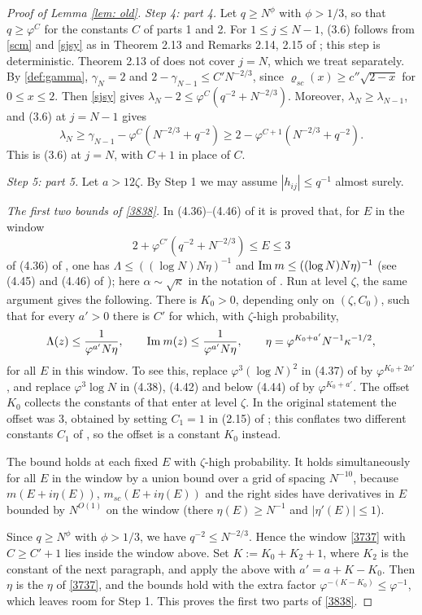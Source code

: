 \begin{proof}[Proof of Lemma \ref{lem: old}]
{\it Step 4: part 4.} Let $q\ge N^\phi$ with $\phi>1/3$, so that $q\ge\varphi^C$ for the constants $C$ of parts 1 and 2. For $1\le j\le N-1$, (3.6) follows from \eqref{scm} and \eqref{sjsy} as in Theorem 2.13 and Remarks 2.14, 2.15 of \cite{EKYY1}; this step is deterministic. Theorem 2.13 of \cite{EKYY1} does not cover $j=N$, which we treat separately. By \eqref{def:gamma}, $\gamma_N=2$ and $2-\gamma_{N-1}\le C'N^{-2/3}$, since $\varrho_{sc}(x)\ge c''\sqrt{2-x}$ for $0\le x\le2$. Then \eqref{sjsy} gives $\lambda_N-2\le\varphi^C(q^{-2}+N^{-2/3})$. Moreover, $\lambda_N\ge\lambda_{N-1}$, and (3.6) at $j=N-1$ gives
$$
\lambda_N\ge\gamma_{N-1}-\varphi^C(N^{-2/3}+q^{-2})\ge2-\varphi^{C+1}(N^{-2/3}+q^{-2}).
$$
This is (3.6) at $j=N$, with $C+1$ in place of $C$.

{\it Step 5: part 5.} Let $a>12\zeta$. By Step 1 we may assume $|h_{ij}|\le q^{-1}$ almost surely.

{\it The first two bounds of \eqref{3838}.} In (4.36)--(4.46) of \cite{EKYY1} it is proved that, for $E$ in the window
$$
2+\varphi^{C'}(q^{-2}+N^{-2/3})\le E\le3
$$
of (4.36) of \cite{EKYY1}, one has $\Lambda\le((\log N)N\eta)^{-1}$ and $\mathrm{Im}\: m\le((\log N)N\eta)^{-1}$ (see (4.45) and (4.46) of \cite{EKYY1}); here $\alpha\sim\sqrt\kappa$ in the notation of \cite{EKYY1}. Run at level $\zeta$, the same argument gives the following. There is $K_0>0$, depending only on $(\zeta,C_0)$, such that for every $a'>0$ there is $C'$ for which, with $\zeta$-high probability,
$$
\Lambda(z)\le\frac{1}{\varphi^{a'}N\eta},\qquad \mathrm{Im}\: m(z)\le\frac{1}{\varphi^{a'}N\eta},\qquad \eta=\varphi^{K_0+a'}N^{-1}\kappa^{-1/2},
$$
for all $E$ in this window. To see this, replace $\varphi^3(\log N)^2$ in (4.37) of \cite{EKYY1} by $\varphi^{K_0+2a'}$, and replace $\varphi^3\log N$ in (4.38), (4.42) and below (4.44) of \cite{EKYY1} by $\varphi^{K_0+a'}$. The offset $K_0$ collects the constants of \cite{EKYY1} that enter at level $\zeta$. In the original statement the offset was $3$, obtained by setting $C_1=1$ in (2.15) of \cite{EKYY1}; this conflates two different constants $C_1$ of \cite{EKYY1}, so the offset is a constant $K_0$ instead.

The bound holds at each fixed $E$ with $\zeta$-high probability. It holds simultaneously for all $E$ in the window by a union bound over a grid of spacing $N^{-10}$, because $m(E+i\eta(E))$, $m_{sc}(E+i\eta(E))$ and the right sides have derivatives in $E$ bounded by $N^{O(1)}$ on the window (there $\eta(E)\ge N^{-1}$ and $|\eta'(E)|\le1$).

Since $q\ge N^\phi$ with $\phi>1/3$, we have $q^{-2}\le N^{-2/3}$. Hence the window \eqref{3737} with $C\ge C'+1$ lies inside the window above. Set $K:=K_0+K_2+1$, where $K_2$ is the constant of the next paragraph, and apply the above with $a'=a+K-K_0$. Then $\eta$ is the $\eta$ of \eqref{3737}, and the bounds hold with the extra factor $\varphi^{-(K-K_0)}\le\varphi^{-1}$, which leaves room for Step 1. This proves the first two parts of \eqref{3838}.


\end{proof}
